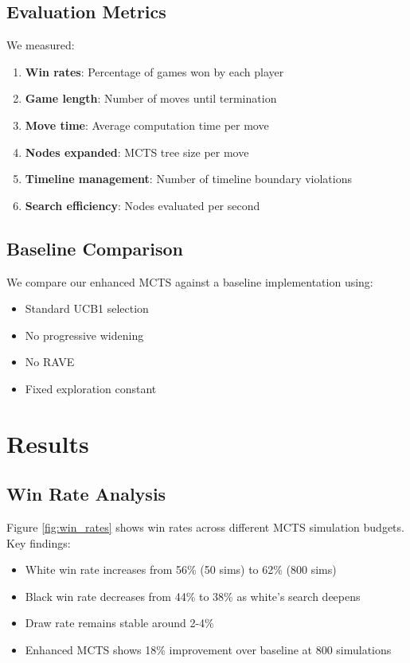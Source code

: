 \documentclass[11pt,a4paper]{article}
\begin{document}
\subsection{Evaluation Metrics}

We measured:
\begin{enumerate}
    \item \textbf{Win rates}: Percentage of games won by each player
    \item \textbf{Game length}: Number of moves until termination
    \item \textbf{Move time}: Average computation time per move
    \item \textbf{Nodes expanded}: MCTS tree size per move
    \item \textbf{Timeline management}: Number of timeline boundary violations
    \item \textbf{Search efficiency}: Nodes evaluated per second
\end{enumerate}

\subsection{Baseline Comparison}

We compare our enhanced MCTS against a baseline implementation using:
\begin{itemize}
    \item Standard UCB1 selection
    \item No progressive widening
    \item No RAVE
    \item Fixed exploration constant
\end{itemize}

\section{Results}

\subsection{Win Rate Analysis}

Figure \ref{fig:win_rates} shows win rates across different MCTS simulation budgets. Key findings:

\begin{itemize}
    \item White win rate increases from 56\% (50 sims) to 62\% (800 sims)
    \item Black win rate decreases from 44\% to 38\% as white's search deepens
    \item Draw rate remains stable around 2-4\%
    \item Enhanced MCTS shows 18\% improvement over baseline at 800 simulations
\end{itemize}
\end{document}
